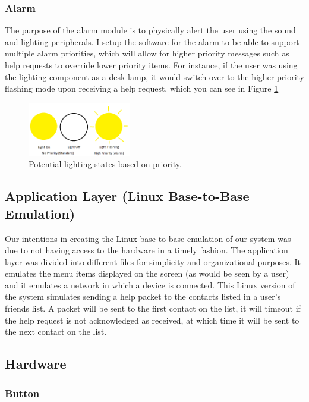 \documentclass[journal,compsoc]{IEEEtran}
\begin{document}
\subsubsection{Alarm}
The purpose of the alarm module is to physically alert the user using the sound and lighting peripherals. I setup the software for the alarm to be able to support multiple alarm priorities, which will allow for higher priority messages such as help requests to override lower priority items. For instance, if the user was using the lighting component as a desk lamp, it would switch over to the higher priority flashing mode upon receiving a help request, which you can see in Figure \ref{Alarm Priorities}
\begin{figure}[ht] 	%
\centering
\includegraphics[width=0.4\textwidth]{AlarmPriority.png}
\caption{ \space Potential lighting states based on priority.}
\label{Alarm Priorities}
\end{figure}

\subsection{Application Layer (Linux Base-to-Base Emulation)}
Our intentions in creating the Linux base-to-base emulation of our system was due to not having access to the hardware in a timely fashion.  The application layer was divided into different files for simplicity and organizational purposes.  It emulates the menu items displayed on the screen (as would be seen by a user) and it emulates a network in which a device is connected.  This Linux version of the system simulates sending a help packet to the contacts listed in a user’s friends list.  A packet will be sent to the first contact on the list, it will timeout if the help request is not acknowledged as received, at which time it will be sent to the next contact on the list.

\subsection{Hardware}

\subsubsection{Button}
\end{document}
